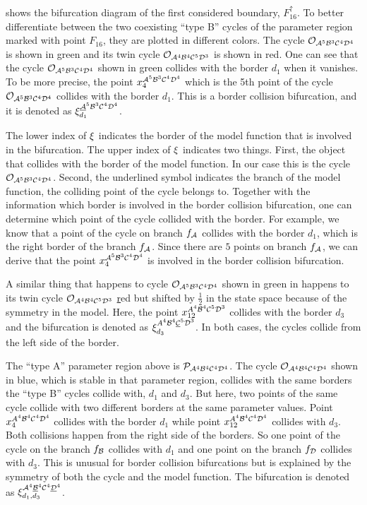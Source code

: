  shows the bifurcation diagram of the first considered boundary, $F_{16}^\uparrow$.
To better differentiate between the two coexisting ``type B'' cycles of the parameter region marked with point $F_{16}$, they are plotted in different colors.
The cycle $\mathcal{O}_{\mathcal{A}^5\mathcal{B}^3\mathcal{C}^4\mathcal{D}^4}$ is shown in green and its twin cycle $\mathcal{O}_{\mathcal{A}^4\mathcal{B}^4\mathcal{C}^5\mathcal{D}^3}$ is shown in  red.
One can see that the cycle $\mathcal{O}_{\mathcal{A}^5\mathcal{B}^3\mathcal{C}^4\mathcal{D}^4}$ shown in green collides with the border $d_1$ when it vanishes.
To be more precise, the point $x_4^{\mathcal{A}^5\mathcal{B}^3\mathcal{C}^4\mathcal{D}^4}$ which is the 5th point of the cycle $\mathcal{O}_{\mathcal{A}^5\mathcal{B}^3\mathcal{C}^4\mathcal{D}^4}$ collides with the border $d_1$.
This is a border collision bifurcation, and it is denoted as $\xi_{d_1}^{\underline{\mathcal{A}}^5\mathcal{B}^3\mathcal{C}^4\mathcal{D}^4}$.

The lower index of $\xi$ indicates the border of the model function that is involved in the bifurcation.
The upper index of $\xi$ indicates two things.
First, the object that collides with the border of the model function.
In our case this is the cycle $\mathcal{O}_{\mathcal{A}^5\mathcal{B}^3\mathcal{C}^4\mathcal{D}^4}$.
Second, the underlined symbol indicates the branch of the model function, the colliding point of the cycle belongs to.
Together with the information which border is involved in the border collision bifurcation, one can determine which point of the cycle collided with the border.
For example, we know that a point of the cycle on branch $f_{\mathcal{A}}$ collides with the border $d_1$, which is the right border of the branch $f_{\mathcal{A}}$.
Since there are $5$ points on branch $f_{\mathcal{A}}$, we can derive that the point $x_4^{\mathcal{A}^5\mathcal{B}^3\mathcal{C}^4\mathcal{D}^4}$ is involved in the border collision bifurcation.

A similar thing that happens to cycle $\mathcal{O}_{\mathcal{A}^5\mathcal{B}^3\mathcal{C}^4\mathcal{D}^4}$ shown in green in  happens to its twin cycle $\mathcal{O}_{\mathcal{A}^4\mathcal{B}^4\mathcal{C}^5\mathcal{D}^3}$ \href{shown in} red but shifted by $\frac{1}{2}$ in the state space because of the symmetry in the model.
Here, the point $x_{12}^{A^4\mathcal{B}^4\mathcal{C}^5\mathcal{D}^3}$ collides with the border $d_3$ and the bifurcation is denoted as $\xi_{d_3}^{A^4\mathcal{B}^4\underline{\mathcal{C}}^5\mathcal{D}^3}$.
In both cases, the cycles collide from the left side of the border.

The ``type A'' parameter region above is $\mathcal{P}_{\mathcal{A}^4\mathcal{B}^4\mathcal{C}^4\mathcal{D}^4}$.
The cycle $\mathcal{O}_{\mathcal{A}^4\mathcal{B}^4\mathcal{C}^4\mathcal{D}^4}$ shown in blue, which is stable in that parameter region, collides with the same borders the ``type B'' cycles collide with, $d_1$ and $d_3$.
But here, two points of the same cycle collide with two different borders at the same parameter values.
Point $x_{4}^{A^4\mathcal{B}^4\mathcal{C}^4\mathcal{D}^4}$ collides with the border $d_1$ while point $x_{12}^{A^4\mathcal{B}^4\mathcal{C}^4\mathcal{D}^4}$ collides with $d_3$.
Both collisions happen from the right side of the borders.
So one point of the cycle on the branch $f_{\mathcal{B}}$ collides with $d_1$ and one point on the branch $f_{\mathcal{D}}$ collides with $d_3$.
This is unusual for border collision bifurcations but is explained by the symmetry of both the cycle and the model function.
The bifurcation is denoted as $\xi_{d_1, d_3}^{\mathcal{A}^4\underline{\mathcal{B}}^4\mathcal{C}^4\underline{\mathcal{D}}^4}$.

